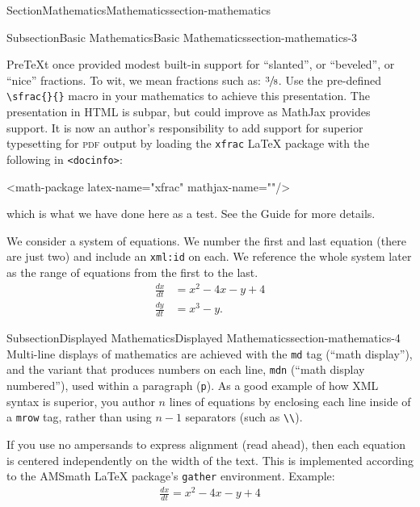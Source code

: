\documentclass[twoside,10pt,]{article}
\newcommand{\mono}[1]{\texttt{#1}}
\newcommand{\initialism}[1]{\textsc{\MakeLowercase{#1}}}
\numberwithin{equation}{section}
\newcommand{\amp}{&}
\begin{document}
\begin{sectionptx}{Section}{Mathematics}{}{Mathematics}{}{}{section-mathematics}
\begin{subsectionptx}{Subsection}{Basic Mathematics}{}{Basic Mathematics}{}{}{section-mathematics-3}
\par
PreTeXt once provided modest built-in support for ``slanted'', or ``beveled'', or ``nice'' fractions.  To wit, we mean fractions such as: \(\sfrac{3}{8}\).  Use the pre-defined \mono{\textbackslash{}sfrac\{\}\{\}} macro in your mathematics to achieve this presentation.  The presentation in HTML is subpar, but could improve as MathJax provides support.  It is now an author's responsibility to add support for superior typesetting for \initialism{PDF} output by loading the \mono{xfrac} \LaTeX{} package with the following in \mono{<docinfo>}:%
\begin{codedisplay}
<math-package latex-name="xfrac" mathjax-name=""/>
\end{codedisplay}
which is what we have done here as a test.  See the Guide for more details.%
\par
We consider a system of equations.  We number the first and last equation (there are just two) and include an \mono{xml:id} on each.  We reference the whole system later as the range of equations from the first to the last.%
\begin{align}
\frac{dx}{dt} \amp = x^2 - 4x - y + 4\label{equation-system-begin}\\
\frac{dy}{dt} \amp = x^3 - y.\label{equation-system-end}
\end{align}
%
\end{subsectionptx}
%
%
\typeout{************************************************}
\typeout{************************************************}
%
\begin{subsectionptx}{Subsection}{Displayed Mathematics}{}{Displayed Mathematics}{}{}{section-mathematics-4}
Multi-line displays of mathematics are achieved with the \mono{md} tag (``math display''), and the variant that produces numbers on each line, \mono{mdn} (``math display numbered''), used within a paragraph (\mono{p}).  As a good example of how XML syntax is superior, you author \(n\) lines of equations by enclosing each line inside of a \mono{mrow} tag, rather than using \(n-1\) separators (such as \mono{\textbackslash{}\textbackslash{}}).%
\par
If you use no ampersands to express alignment (read ahead), then each equation is centered independently on the width of the text.  This is implemented according to the AMSmath \LaTeX{} package's \mono{gather} environment.  Example:%
\begin{gather*}
\frac{dx}{dt} = x^2 - 4x - y + 4\\

\end{gather*}
\end{subsectionptx}
\end{sectionptx}
\end{document}

